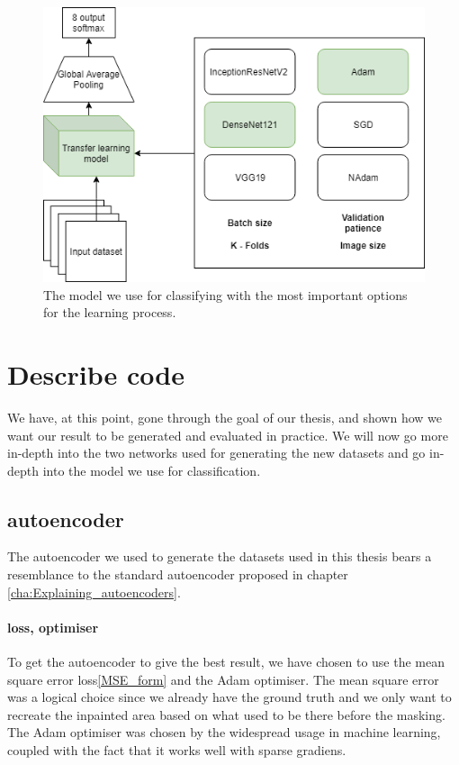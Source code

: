 \begin{figure}[h]
        \centering
        \includegraphics[scale=0.5]{experiments/figures/model.png}
        \caption{ The model we use for classifying with the most important options for the learning process. }
    \label{fig:KTLmodel}
\end{figure}

 
\section{Describe code}
We have, at this point, gone through the goal of our thesis, and shown how we want our result to be generated and evaluated in practice. 
We will now go more in-depth into the two networks used for generating the new datasets and go in-depth into the model we use for classification.


\subsection{autoencoder}
The autoencoder we used to generate the datasets used in this thesis bears a resemblance to the standard autoencoder proposed in chapter \ref{cha:Explaining_autoencoders}.

\paragraph{loss, optimiser}
To get the autoencoder to give the best result, we have chosen to use the mean square error loss\ref{MSE_form} and the Adam\cite{adam} optimiser.
The mean square error was a logical choice since we already have the ground truth and we only want to recreate the inpainted area based on what used to be there before the masking.
The Adam optimiser was chosen by the widespread usage in machine learning, coupled with the fact that it works well with sparse gradiens.

